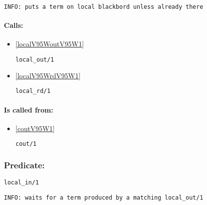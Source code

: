 {\small \begin{verbatim}
INFO: puts a term on local blackbord unless already there

\end{verbatim}}
\paragraph{Calls:} 
\begin{itemize}
\item \ref{localV95WoutV95W1} 
\begin{verbatim}
local_out/1
\end{verbatim}

\item \ref{localV95WrdV95W1} 
\begin{verbatim}
local_rd/1
\end{verbatim}

\end{itemize}
\paragraph{Is called from:} 
\begin{itemize}
\item \ref{coutV95W1} 
\begin{verbatim}
cout/1
\end{verbatim}

\end{itemize}

\subsubsection{Predicate:} \label{localV95WinV95W1}

\begin{verbatim}
local_in/1
\end{verbatim}

{\small \begin{verbatim}
INFO: waits for a term produced by a matching local_out/1

\end{verbatim}}
